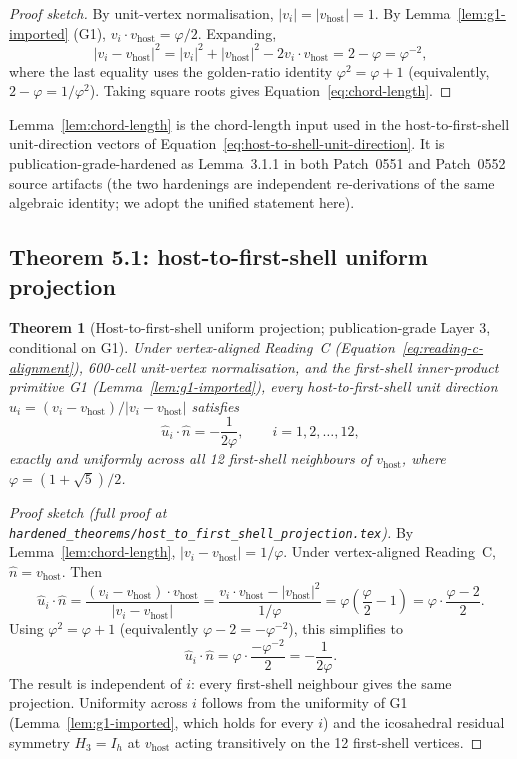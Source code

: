 \documentclass[11pt,letterpaper]{article}
\newtheorem{theorem}{Theorem}[section]
\newcommand{\phig}{\varphi}
\newcommand{\vhost}{v_{\text{host}}}
\begin{document}
\begin{proof}[Proof sketch]
By unit-vertex normalisation, $|v_i| = |\vhost| = 1$. By Lemma~\ref{lem:g1-imported} (G1), $v_i \cdot \vhost = \phig/2$. Expanding,
\[
|v_i - \vhost|^2 = |v_i|^2 + |\vhost|^2 - 2 v_i \cdot \vhost = 2 - \phig = \phig^{-2},
\]
where the last equality uses the golden-ratio identity $\phig^2 = \phig + 1$ (equivalently, $2 - \phig = 1/\phig^2$). Taking square roots gives Equation~\eqref{eq:chord-length}.
\end{proof}

Lemma~\ref{lem:chord-length} is the chord-length input used in the host-to-first-shell unit-direction vectors of Equation~\eqref{eq:host-to-shell-unit-direction}. It is publication-grade-hardened as Lemma~3.1.1 in both Patch~0551 and Patch~0552 source artifacts (the two hardenings are independent re-derivations of the same algebraic identity; we adopt the unified statement here).

\subsection{Theorem 5.1: host-to-first-shell uniform projection}
\label{sec:host-first-shell-projection}

\begin{theorem}[Host-to-first-shell uniform projection; publication-grade Layer 3, conditional on G1]
\label{thm:host-first-shell-projection}
Under vertex-aligned Reading~C (Equation~\eqref{eq:reading-c-alignment}), 600-cell unit-vertex normalisation, and the first-shell inner-product primitive G1 (Lemma~\ref{lem:g1-imported}), every host-to-first-shell unit direction $\hat{u}_i = (v_i - \vhost) / |v_i - \vhost|$ satisfies
\begin{equation}
\hat{u}_i \cdot \hat{n} = -\frac{1}{2 \phig}, \qquad i = 1, 2, \ldots, 12,
\label{eq:host-first-shell-projection}
\end{equation}
exactly and uniformly across all 12 first-shell neighbours of $\vhost$, where $\phig = (1 + \sqrt{5})/2$.
\end{theorem}

\begin{proof}[Proof sketch (full proof at \texttt{hardened\_theorems/host\_to\_first\_shell\_projection.tex})]
By Lemma~\ref{lem:chord-length}, $|v_i - \vhost| = 1/\phig$. Under vertex-aligned Reading~C, $\hat{n} = \vhost$. Then
\[
\hat{u}_i \cdot \hat{n} = \frac{(v_i - \vhost) \cdot \vhost}{|v_i - \vhost|} = \frac{v_i \cdot \vhost - |\vhost|^2}{1/\phig} = \phig \left( \frac{\phig}{2} - 1 \right) = \phig \cdot \frac{\phig - 2}{2}.
\]
Using $\phig^2 = \phig + 1$ (equivalently $\phig - 2 = -\phig^{-2}$), this simplifies to
\[
\hat{u}_i \cdot \hat{n} = \phig \cdot \frac{-\phig^{-2}}{2} = -\frac{1}{2\phig}.
\]
The result is independent of $i$: every first-shell neighbour gives the same projection. Uniformity across $i$ follows from the uniformity of G1 (Lemma~\ref{lem:g1-imported}, which holds for every $i$) and the icosahedral residual symmetry $H_3 = I_h$ at $\vhost$ acting transitively on the 12 first-shell vertices.
\end{proof}
\end{document}
